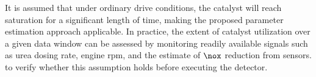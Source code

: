 It is assumed that under ordinary drive conditions, the catalyst will reach saturation for a significant length of time, making the proposed parameter estimation approach applicable. In practice, the extent of catalyst utilization over a given data window can be assessed by monitoring readily available signals such as urea dosing rate, engine rpm, and the estimate of $\nox$ reduction from sensors. to verify whether this assumption holds before executing the detector.

